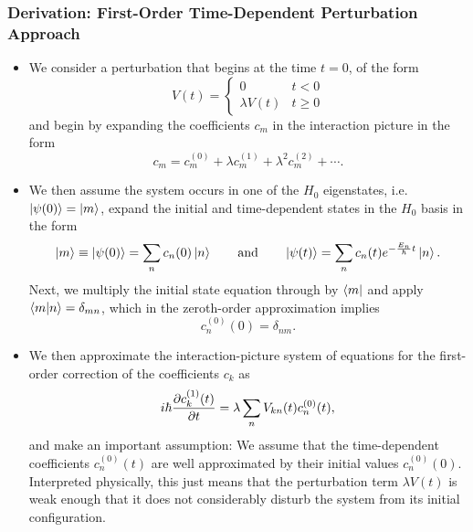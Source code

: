\documentclass[11pt, a4paper]{article}
\begin{document}
\subsubsection{Derivation: First-Order Time-Dependent Perturbation Approach}
\begin{itemize}
    \item We consider a perturbation that begins at the time $ t = 0 $, of the form
    \begin{equation*}
        V(t) = 
        \begin{cases}
            0 & t < 0 \\
            \lambda V(t) & t \geq 0
        \end{cases}
    \end{equation*}
    and begin by expanding the coefficients $ c_{m} $ in the interaction picture in the form
    \begin{equation*}
        c_{m} = c_{m}^{(0)} + \lambda c_{m}^{(1)} + \lambda^{2} c_{m}^{(2)} + \cdots.
    \end{equation*}
    
    \item We then assume the system occurs in one of the $ H_{0} $ eigenstates, i.e. $ \ket{\psi(0)} = \ket{m} $, expand the initial and time-dependent states in the $ H_{0} $ basis in the form
    \begin{equation*}
        \ket{m} \equiv \ket{\psi(0)} = \sum_{n} c_{n}(0)\ket{n} \qquad \text{and} \qquad \ket{\psi(t)} = \sum_{n} c_{n}(t)e^{- \frac{E_{n}}{\hbar}t}\ket{n}.
    \end{equation*}
    Next, we multiply the initial state equation through by $ \bra{m} $ and apply $ \braket{m}{n} = \delta_{mn} $, which in the zeroth-order approximation implies
    \begin{equation*}
        c_{n}^{(0)}(0) = \delta_{nm}.
    \end{equation*}

    \item We then approximate the interaction-picture system of equations for the first-order correction of the coefficients $ c_{k} $ as
    \begin{equation*}
        i \hbar \pdv{c_{k}^{(1)}(t)}{t} = \lambda \sum_{n} V_{kn}(t) c_{n}^{(0)}(t),
    \end{equation*}
    and make an important assumption: We assume that the time-dependent coefficients $ c_{n}^{(0)}(t) $ are well approximated by their initial values $ c_{n}^{(0)}(0) $. Interpreted physically, this just means that the perturbation term $ \lambda V(t) $ is weak enough that it does not considerably disturb the system from its initial configuration.


\end{itemize}
\end{document}
